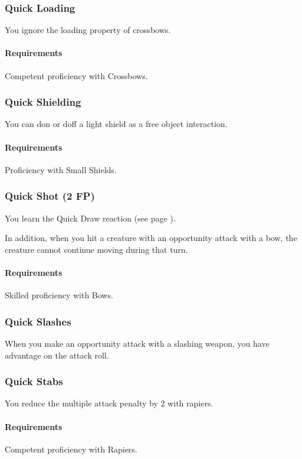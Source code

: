 \subsubsection{Quick Loading} \label{feat::quickloading}
    You ignore the loading property of crossbows.
    \paragraph{Requirements} Competent proficiency with Crossbows.
\subsubsection{Quick Shielding} \label{feat::quickshielding}
    You can don or doff a light shield as a free object interaction.
    \paragraph{Requirements} Proficiency with Small Shields.
\subsubsection{Quick Shot (2 FP)} \label{feat::quickshot}
    You learn the Quick Draw reaction (see page \pageref{act::quickdraw}).

    In addition, when you hit a creature with an opportunity attack with a bow, the creature cannot continue moving during that turn.
    \paragraph{Requirements} Skilled proficiency with Bows.
\subsubsection{Quick Slashes} \label{feat::quickslashes}
    When you make an opportunity attack with a slashing weapon, you have advantage on the attack roll.
\subsubsection{Quick Stabs} \label{feat::quickstabs}
    You reduce the multiple attack penalty by 2 with rapiers.
    \paragraph{Requirements} Competent proficiency with Rapiers.
